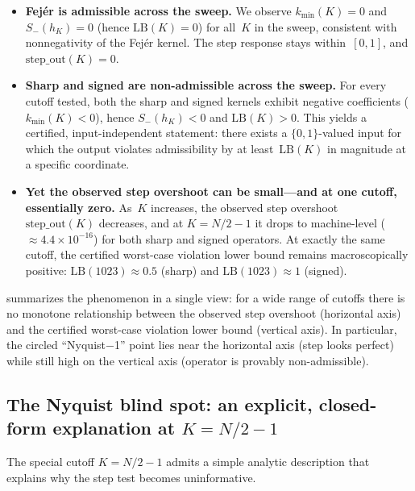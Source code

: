 \documentclass[11pt,a4paper]{article}
\theoremstyle{plain}
\theoremstyle{definition}
\theoremstyle{plain}
\newcommand{\Sminus}{S_{-}}
\newcommand{\stepout}{\mathrm{step\_out}}
\begin{document}
\begin{itemize}[leftmargin=2em]
  \item \textbf{Fej\'er is admissible across the sweep.}  We observe
    $k_{\min}(K) = 0$ and $\Sminus(h_K) = 0$ (hence $\mathrm{LB}(K) = 0$)
    for all~$K$ in the sweep, consistent with nonnegativity of the Fej\'er
    kernel.  The step response stays within~$[0,1]$, and $\stepout(K) = 0$.

  \item \textbf{Sharp and signed are non-admissible across the sweep.}  For
    every cutoff tested, both the sharp and signed kernels exhibit negative
    coefficients ($k_{\min}(K) < 0$), hence $\Sminus(h_K) < 0$ and
    $\mathrm{LB}(K) > 0$.  This yields a certified, input-independent statement:
    there exists a $\{0,1\}$-valued input for which the output violates
    admissibility by at least~$\mathrm{LB}(K)$ in magnitude at a specific
    coordinate.

  \item \textbf{Yet the observed step overshoot can be small---and at one
    cutoff, essentially zero.}  As~$K$ increases, the observed step
    overshoot~$\stepout(K)$ decreases, and at $K = N/2-1$ it drops to
    machine-level ($\approx 4.4 \times 10^{-16}$) for both sharp and signed
    operators.  At exactly the same cutoff, the certified worst-case violation
    lower bound remains macroscopically positive:
    $\mathrm{LB}(1023) \approx 0.5$ (sharp) and
    $\mathrm{LB}(1023) \approx 1$ (signed).
\end{itemize}

 summarizes the phenomenon in a single view: for a wide
range of cutoffs there is no monotone relationship between the observed step
overshoot (horizontal axis) and the certified worst-case violation lower bound
(vertical axis).  In particular, the circled ``Nyquist$-$1'' point lies near the
horizontal axis (step looks perfect) while still high on the vertical axis
(operator is provably non-admissible).


\subsection{The Nyquist blind spot: an explicit, closed-form explanation
  at $K = N/2-1$}
\label{sec:nyquist-closed}

The special cutoff $K = N/2-1$ admits a simple analytic description that explains
why the step test becomes uninformative.
\end{document}
